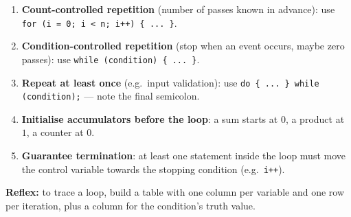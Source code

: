 \documentclass[11pt]{article}
\begin{document}
\begin{methode}
\begin{enumerate}
\item \textbf{Count-controlled repetition} (number of passes known in advance): use \texttt{for (i = 0; i < n; i++) \{ ... \}}.
\item \textbf{Condition-controlled repetition} (stop when an event occurs, maybe zero passes): use \texttt{while (condition) \{ ... \}}.
\item \textbf{Repeat at least once} (e.g.\ input validation): use \texttt{do \{ ... \} while (condition);} — note the final semicolon.
\item \textbf{Initialise accumulators before the loop}: a sum starts at $0$, a product at $1$, a counter at $0$.
\item \textbf{Guarantee termination}: at least one statement inside the loop must move the control variable towards the stopping condition (e.g.\ \texttt{i++}).
\end{enumerate}
\textbf{Reflex:} to trace a loop, build a table with one column per variable and one row per iteration, plus a column for the condition's truth value.
\end{methode}
\end{document}
